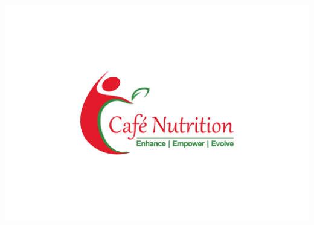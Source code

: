 \documentclass[]{article}
\begin{document}
\newpage

\includegraphics{../Files/cf_logo.jpg}
\end{document}
